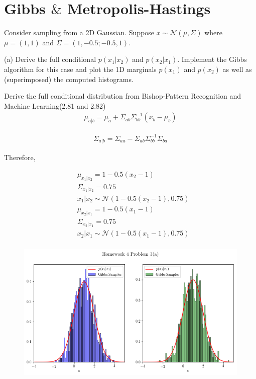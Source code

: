 \documentclass{article}
\begin{document}
\section{Gibbs $\&$ Metropolis-Hastings}
Consider sampling from a 2D Gaussian. Suppose $x \sim \mathcal{N}(\mu, \Sigma) $ where $\mu = (1,1)$ and $\Sigma = (1,-0.5;-0.5,1)$.

(a) Derive the full conditional $p(x_1 | x_2)$ and $p(x_2 | x_1)$. Implement the Gibbs algorithm for this case and plot the 1D marginals $p(x_1)$ and $p(x_2)$ as well as (superimposed) the computed histograms.

Derive the full conditional distribution from Bishop-Pattern Recognition and Machine Learning(2.81 and 2.82)
\begin{equation}
\begin{aligned}
\mu_{a|b} = \mu_{a} + \Sigma_{ab}\Sigma_{bb}^{-1}(x_{b}-\mu_{b})
\end{aligned}
\end{equation}

\begin{equation}
\begin{aligned}
\Sigma_{a|b} = \Sigma_{aa} -\Sigma_{ab}\Sigma_{bb}^{-1}\Sigma_{ba}
\end{aligned}
\end{equation}

Therefore,

\begin{equation}
\begin{aligned}
& \mu_{x_1|x_2} = 1 -0.5(x_{2}-1) \\
& \Sigma_{x_1|x_2} = 0.75 \\
& x_1|x_2 \sim \mathcal{N}(1 -0.5(x_{2}-1), 0.75) \\
& \mu_{x_2|x_1} = 1 -0.5(x_{1}-1) \\
& \Sigma_{x_2|x_1} = 0.75 \\
& x_2|x_1 \sim \mathcal{N}(1 -0.5(x_{1}-1), 0.75) \\
\end{aligned}
\end{equation}

\begin{figure}[h!]
\centering
\includegraphics[scale=0.45]{HW4P41.png}
\caption{ }
\end{figure}
\end{document}
